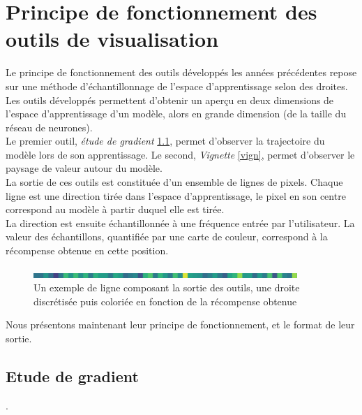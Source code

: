 \documentclass[12pt]{article}
\begin{document}
\newpage
\section{Principe de fonctionnement des outils de visualisation}

Le principe de fonctionnement des outils développés les années précédentes repose sur une méthode d’échantillonnage de l’espace d’apprentissage selon des droites. \\

Les outils développés permettent d'obtenir un aperçu en deux dimensions de l'espace d'apprentissage d'un modèle, alors en grande dimension (de la taille du réseau de neurones). \\

Le premier outil, \emph{étude de gradient} \ref{gradient}, permet d'observer la trajectoire du modèle lors de son apprentissage. Le second, \emph{Vignette} \ref{vign}, permet d'observer le paysage de valeur autour du modèle. \\

La sortie de ces outils est constituée d’un ensemble de lignes de pixels. Chaque ligne est une direction tirée dans l’espace d’apprentissage, le pixel en son centre correspond au modèle à partir duquel elle est tirée. \\

La direction est ensuite échantillonnée à une fréquence entrée par l’utilisateur. La valeur des échantillons, quantifiée par une carte de couleur, correspond à la récompense obtenue en cette position. \\

\begin{figure}[htp]
    \centering
    \includegraphics[width=10cm]{Images/Ligne}
    \caption{Un exemple de ligne composant la sortie des outils, une droite discrétisée puis coloriée en fonction de la récompense obtenue}
    \label{fig:ligne1}
\end{figure}

Nous présentons maintenant leur principe de fonctionnement, et le format de leur sortie. \\

\subsection{Etude de gradient} \label{gradient}.
\end{document}
